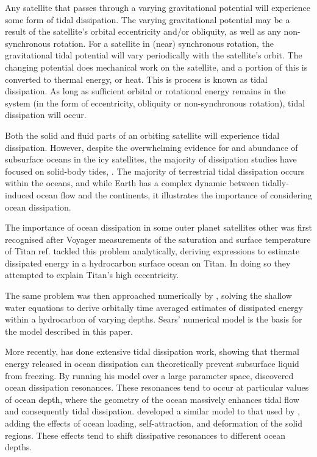 Any satellite that passes through a varying gravitational potential will experience some form of tidal dissipation. The varying gravitational potential may be a result of the satellite's orbital eccentricity and/or obliquity, as well as any non-synchronous rotation. For a satellite in (near) synchronous rotation, the gravitational tidal potential will vary periodically with the satellite's orbit. The changing potential does mechanical work on the satellite, and a portion of this is converted to thermal energy, or heat. This is process is known as tidal dissipation. As long as sufficient orbital or rotational energy remains in the system (in the form of eccentricity, obliquity or non-synchronous rotation), tidal dissipation will occur.

Both the solid and fluid parts of an orbiting satellite will experience tidal dissipation. 
However, despite the overwhelming evidence for and abundance of subsurface oceans in the icy satellites, the majority of dissipation studies have focused on solid-body tides, \citep[e.g.,][]{moore2000tidal, roberts2008tidal, beuthe2013spatial}. 
The majority of terrestrial tidal dissipation occurs within the oceans, and while Earth has a complex dynamic between tidally-induced ocean flow and the continents, it illustrates the importance of considering ocean dissipation.

The importance of ocean dissipation in some outer planet satellites other was first recognised after Voyager measurements of the saturation and surface temperature of Titan {ref}. \citet{sagan1982tide} tackled this problem analytically, deriving expressions to estimate dissipated energy in a hydrocarbon surface ocean on Titan. In doing so they attempted to explain Titan's high eccentricity.

The same problem was then approached numerically by \citet{sears1995tidal}, solving the shallow water equations to derive orbitally time averaged estimates of dissipated energy within a hydrocarbon of varying depths. Sears' numerical model is the basis for the model described in this paper. 

More recently, \citet{tyler2008strong,tyler2009ocean,tyler2011tidal,tyler2014comparative} has done extensive tidal dissipation work, showing that thermal energy released in ocean dissipation can theoretically prevent subsurface liquid from freezing. By running his model over a large parameter space, \citet{tyler2011tidal} discovered ocean dissipation resonances. These resonances tend to occur at particular values of ocean depth, where the geometry of the ocean massively enhances tidal flow and consequently tidal dissipation. \citet{matsuyama2014tidal} developed a similar model to that used by \citet{tyler2011tidal}, adding the effects of ocean loading, self-attraction, and deformation of the solid regions. These effects tend to shift dissipative resonances to different ocean depths.

